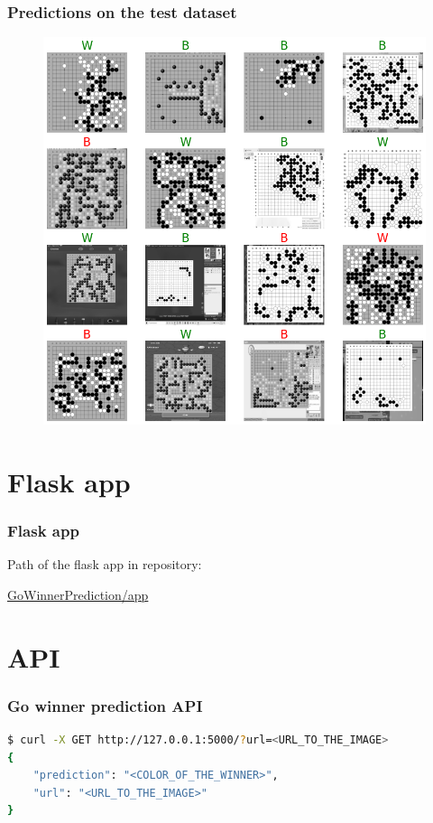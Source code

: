 \documentclass{beamer}
\begin{document}

\begin{frame}
\frametitle{Predictions on the test dataset}

\begin{figure}
	\centering
	\includegraphics[scale=0.25]{images/predictions.png}
\end{figure}


\end{frame}


\section{Flask app}
\begin{frame}
\frametitle{Flask app}

\begin{center}
Path of the flask app in repository: 

\url{GoWinnerPrediction/app}
\end{center}

\end{frame}

\section{API}
\begin{frame}[fragile]
\frametitle{Go winner prediction API}
\begin{lstlisting}[basicstyle=\footnotesize, language=bash]
$ curl -X GET http://127.0.0.1:5000/?url=<URL_TO_THE_IMAGE>
{
    "prediction": "<COLOR_OF_THE_WINNER>",
    "url": "<URL_TO_THE_IMAGE>"
}
\end{lstlisting}

\end{frame}
\end{document}
